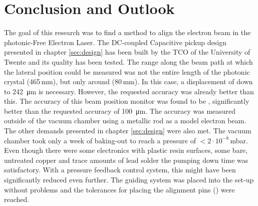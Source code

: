 \chapter{Conclusion and Outlook}
The goal of this research was to find a method to align the electron beam in the photonic-Free Electron Laser.
The DC-coupled Capacitive pickup design presented in chapter \ref{sec:design} has been built by the TCO of the University of Twente and its quality has been tested. 
The range along the beam path at which the lateral position could be measured was not the entire length of the photonic crystal (465\,mm), but only around (80\,mm). In this case, a displacement of down to \SI{242}{\micro\meter} is necessary. However, the requested accuracy was already better than this.
The accuracy of this beam position monitor was found to be , significantly better than the requested accuracy of \SI{100}{\micro\meter}. The accuracy was measured outside of the vacuum chamber using a metallic rod as a model electron beam.
The other demands presented in chapter \ref{sec:design} were also met. 
The vacuum chamber took only a week of baking-out to reach a pressure of $< 2\cdot 10^{-8}$\,mbar. Even though there were some electronics with plastic resin surfaces, some bare, untreated copper and trace amounts of lead solder the pumping down time was satisfactory.
With a pressure feedback control system, this might have been significantly reduced even further.
The guiding system was placed into the set-up without problems and the tolerances for placing the alignment pins () were reached.